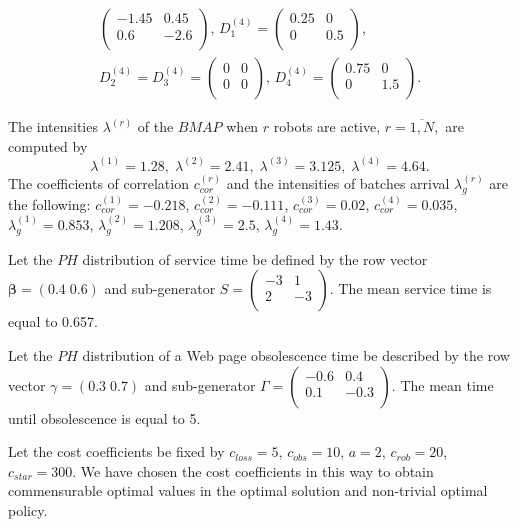 \documentclass[11pt]{article}
\begin{document}
\begin{gather*}
\begin{pmatrix}
  -1.45 & 0.45 \\
  0.6 & -2.6 \\
\end{pmatrix},\,
D_1^{(4)}=\begin{pmatrix}
  0.25 & 0 \\
  0 & 0.5 \\
\end{pmatrix},\\
D_2^{(4)}=D_3^{(4)}=\begin{pmatrix}
  0 & 0 \\
  0 & 0 \\
\end{pmatrix},\,
D_4^{(4)}=\begin{pmatrix}
  0.75 & 0 \\
  0 & 1.5 \\
\end{pmatrix}.
\end{gather*}

The intensities $\lambda^{(r)}$ of the $BMAP$ when $r$ robots are
active, $r=\overline{1,N},$ are computed by
$$\lambda^{(1)}=1.28,\; \lambda^{(2)}=2.41,\;\lambda^{(3)}=3.125,\; \lambda^{(4)}=4.64.$$
The  coefficients of correlation $c_{cor}^{(r)}$ and the intensities
of  batches arrival $\lambda^{(r)}_g$ are the following:
$c_{cor}^{(1)}=-0.218$, $c_{cor}^{(2)}=-0.111$,
$c_{cor}^{(3)}=0.02$, $c_{cor}^{(4)}=0.035$,
$\lambda^{(1)}_g=0.853$, $\lambda^{(2)}_g=1.208$,
$\lambda^{(3)}_g=2.5$, $\lambda^{(4)}_g=1.43$.

Let the $PH$ distribution of service time be defined by the row
vector ${\boldsymbol \beta}=(0.4\;0.6)$ and sub-generator
$S=\begin{pmatrix}
  -3  & 1 \\
  2 & -3 \\
\end{pmatrix}.$  The mean service
time is equal to 0.657.

Let the $PH$ distribution of a Web page obsolescence time be
described by the row vector $\gamma=(0.3\; 0.7)$ and  sub-generator
$\Gamma=\begin{pmatrix}
  -0.6 & 0.4 \\
  0.1 & -0.3 \\
\end{pmatrix}.$  The mean time
until obsolescence is equal to 5.

Let the cost  coefficients be fixed by $c_{loss}=5$, $c_{obs}=10$,
$a=2$, $c_{rob}=20$, $c_{star}=300.$ We have chosen the cost coefficients
in this way to obtain commensurable optimal values in the optimal solution
and non-trivial optimal policy.
\end{document}
